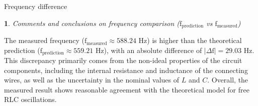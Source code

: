 \documentclass[12pt,oneside,a4paper]{article}
\theoremstyle{definition}
\newtheorem{bt}{}
\begin{document}
	Frequency difference
	\begin{center}
	\end{center}
	
	\begin{bt}
		\textit{Comments and conclusions on frequency comparison ($\text{f}_{\text{prediction}}$ vs $\text{f}_{\text{measured}}$)}
		
		\vspace{0.2cm}
		The measured frequency ($\text{f}_{\text{measured}} \approx 588.24\text{ Hz}$) is higher than the theoretical prediction ($\text{f}_{\text{prediction}} \approx 559.21\text{ Hz}$), with an absolute difference of $\left|\Delta \text{f}\right| = 29.03\text{ Hz}$.   This discrepancy primarily comes from the non-ideal properties of the circuit components, including the internal resistance and inductance of the connecting wires, as well as the uncertainty in the nominal values of $L$ and $C$. Overall, the measured result shows reasonable agreement with the theoretical model for free RLC oscillations.
	\end{bt}
	
\end{document}
